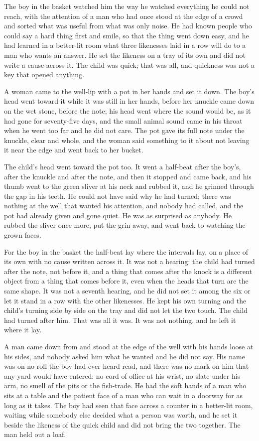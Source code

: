 The boy in the basket watched him the way he watched everything he could not reach, with the attention of a man who had once stood at the edge of a crowd and sorted what was useful from what was only noise. He had known people who could say a hard thing first and smile, so that the thing went down easy, and he had learned in a better-lit room what three likenesses laid in a row will do to a man who wants an answer. He set the likeness on a tray of its own and did not write a cause across it. The child was quick; that was all, and quickness was not a key that opened anything.

A woman came to the well-lip with a pot in her hands and set it down. The boy's head went toward it while it was still in her hands, before her knuckle came down on the wet stone, before the note; his head went where the sound would be, as it had gone for seventy-five days, and the small animal sound came in his throat when he went too far and he did not care. The pot gave its full note under the knuckle, clear and whole, and the woman said something to it about not leaving it near the edge and went back to her bucket.

The child's head went toward the pot too. It went a half-beat after the boy's, after the knuckle and after the note, and then it stopped and came back, and his thumb went to the green sliver at his neck and rubbed it, and he grinned through the gap in his teeth. He could not have said why he had turned; there was nothing at the well that wanted his attention, and nobody had called, and the pot had already given and gone quiet. He was as surprised as anybody. He rubbed the sliver once more, put the grin away, and went back to watching the grown faces.

For the boy in the basket the half-beat lay where the intervals lay, on a place of its own with no cause written across it. It was not a hearing: the child had turned after the note, not before it, and a thing that comes after the knock is a different object from a thing that comes before it, even when the heads that turn are the same shape. It was not a seventh hearing, and he did not set it among the six or let it stand in a row with the other likenesses. He kept his own turning and the child's turning side by side on the tray and did not let the two touch. The child had turned after him. That was all it was. It was not nothing, and he left it where it lay.

\scenebreak

A man came down from  and stood at the edge of the well with his hands loose at his sides, and nobody asked him what he wanted and he did not say. His name was on no roll the boy had ever heard read, and there was no mark on him that any yard would have entered: no cord of office at his wrist, no slate under his arm, no smell of the pits or the fish-trade. He had the soft hands of a man who sits at a table and the patient face of a man who can wait in a doorway for as long as it takes. The boy had seen that face across a counter in a better-lit room, waiting while somebody else decided what a person was worth, and he set it beside the likeness of the quick child and did not bring the two together. The man held out a loaf.

